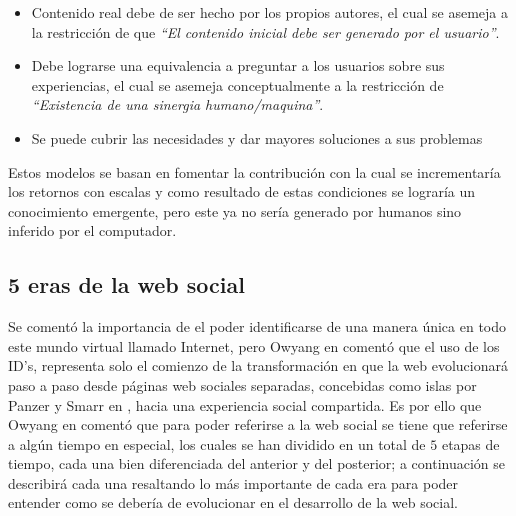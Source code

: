 \documentclass[oneside,12pt,a4paper]{memoir}%
\begin{document}
\begin{itemize}
	  \begin{itemize}
	    \item Contenido real debe de ser hecho por los propios autores, el cual se
	    asemeja a la restricci\'on de que \textit{``El contenido inicial debe ser
	    generado por el usuario''}.
	    \item Debe lograrse una equivalencia a preguntar a los usuarios sobre sus
	    experiencias, el cual se asemeja conceptualmente a la restricci\'on de
	    \textit{``Existencia de una sinergia humano/maquina''}.
	    \item Se puede cubrir las necesidades y dar mayores soluciones a sus
	    problemas
	  \end{itemize} 
	  
	\end{itemize}
	

	Estos modelos se basan en fomentar la contribuci\'on con la cual se
	incrementar\'ia los retornos con escalas y como resultado de estas condiciones
	se lograr\'ia un conocimiento emergente, pero este ya no ser\'ia generado por
	humanos sino inferido por el computador.
	
		\subsection{5 eras de la web social}
		\label{ssec:5eras}
		Se coment\'o la importancia de el poder identificarse de una manera
		\'unica en todo este mundo virtual llamado Internet, pero
		Owyang en \cite{Owyang2009} coment\'o que el uso de los ID's, representa solo
		el comienzo de la transformaci\'on en que la web evolucionar\'a paso a paso
		desde p\'aginas web sociales separadas, concebidas como islas por
		Panzer y Smarr en \cite{Smarr2010}, hacia una experiencia social compartida.
		Es por ello que Owyang en \cite{Forrester2009} coment\'o que
		para poder referirse a la web social se tiene que referirse a alg\'un tiempo
		en especial, los cuales se han dividido en un total de $5$ etapas de tiempo,
		cada una bien diferenciada del anterior y del posterior; a continuaci\'on se
		describir\'a cada una resaltando lo m\'as importante de cada era para poder
		entender como se deber\'ia de evolucionar en el desarrollo de la
		web social.
		
	
\end{document}
